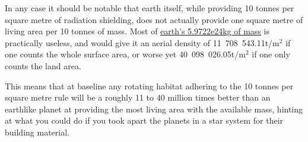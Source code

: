 \documentclass[a4paper]{article}
\begin{document}
	\medskip
	
	In any case it should be notable that earth itself, while providing 10 tonnes per square metre of radiation shielding, does not actually provide one square metre of living area per 10 tonnes of mass. Most of \href{https://en.wikipedia.org/wiki/Earth_mass}{earth's 5.9722e24kg of mass} is practically useless, and would give it an aerial density of 11~708~543.11t/m$^2$ if one counts the whole surface area, or worse yet 40~098~026.05t/m$^2$ if one only counts the land area.
	
	\medskip
	
	This means that at baseline any rotating habitat adhering to the 10 tonnes per square metre rule will be a roughly 11 to 40 million times better than an earthlike planet at providing the most living area with the available mass, hinting at what you could do if you took apart the planets in a star system for their building material.
	
\end{document}
